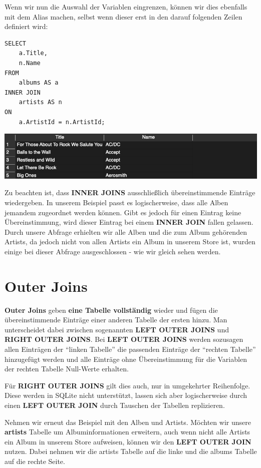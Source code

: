 \documentclass[
]{book}
\begin{document}
Wenn wir nun die Auswahl der Variablen eingrenzen, können wir dies ebenfalls mit dem Alias machen, selbst wenn dieser erst in den darauf folgenden Zeilen definiert wird:

\begin{verbatim}
SELECT
    a.Title,
    n.Name
FROM
    albums AS a
INNER JOIN
    artists AS n
ON
    a.ArtistId = n.ArtistId;
\end{verbatim}

\includegraphics[width=10.41667in,height=\textheight]{img-JOIN2.png}

Zu beachten ist, dass \textbf{INNER JOINS} ausschließlich übereinstimmende Einträge wiedergeben. In unserem Beispiel passt es logischerweise, dass alle Alben jemandem zugeordnet werden können. Gibt es jedoch für einen Eintrag keine Übereinstimmung, wird dieser Eintrag bei einem \textbf{INNER JOIN} fallen gelassen. Durch unsere Abfrage erhielten wir alle Alben und die zum Album gehörenden Artists, da jedoch nicht von allen Artists ein Album in unserem Store ist, wurden einige bei dieser Abfrage ausgeschlossen - wie wir gleich sehen werden.

\hypertarget{outer-joins}{%
\section{Outer Joins}\label{outer-joins}}

\textbf{Outer Joins} geben \textbf{eine Tabelle vollständig} wieder und fügen die übereinstimmende Einträge einer anderen Tabelle der ersten hinzu. Man unterscheidet dabei zwischen sogenannten \textbf{LEFT OUTER JOINS} und \textbf{RIGHT OUTER JOINS}. Bei \textbf{LEFT OUTER JOINS} werden sozusagen allen Einträgen der ``linken Tabelle'' die passenden Einträge der ``rechten Tabelle'' hinzugefügt werden und alle Einträge ohne Übereinstimmung für die Variablen der rechten Tabelle Null-Werte erhalten.

Für \textbf{RIGHT OUTER JOINS} gilt dies auch, nur in umgekehrter Reihenfolge. Diese werden in SQLite nicht unterstützt, lassen sich aber logischerweise durch einen \textbf{LEFT OUTER JOIN} durch Tauschen der Tabellen replizieren.

Nehmen wir erneut das Beispiel mit den Alben und Artists. Möchten wir unsere \textbf{artists} Tabelle um Albuminformationen erweitern, auch wenn nicht alle Artists ein Album in unserem Store aufweisen, können wir den \textbf{LEFT OUTER JOIN} nutzen. Dabei nehmen wir die artists Tabelle auf die linke und die albums Tabelle auf die rechte Seite.
\end{document}
